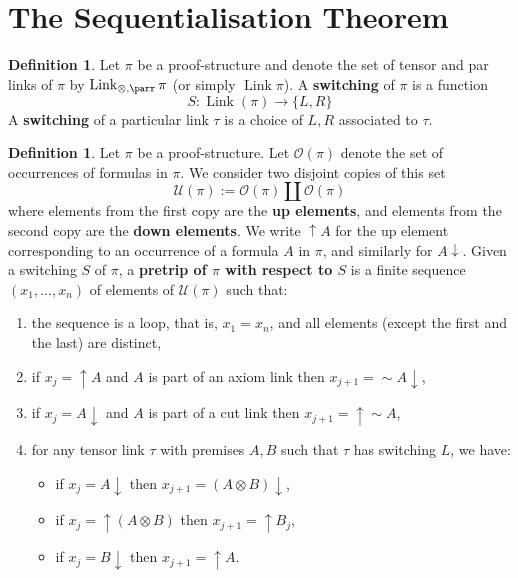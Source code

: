 \documentclass[12pt]{article}
\theoremstyle{plain}
\theoremstyle{definition}
\newtheorem{defn}[thm]{Definition} %
\newcommand{\call}[1]{\mathcal{#1}}
\newcommand{\lto}{\longrightarrow}
\newcommand{\negation}{\sim}
\begin{document}
\section{The Sequentialisation Theorem}\label{sec:sequentialisation}
\begin{defn}
Let $\pi$ be a proof-structure and denote the set of tensor and par links of $\pi$ by $\operatorname{Link}_{\otimes,\parr}\pi$ (or simply $\operatorname{Link}\pi$). A \textbf{switching} of $\pi$ is a function
\begin{equation}
    S: \operatorname{Link}(\pi) \lto \lbrace L,R\rbrace
\end{equation}
A \textbf{switching} of a particular link $\tau$ is a choice of $L,R$ associated to $\tau$.
\end{defn}
\begin{defn}\label{def:trip}
Let $\pi$ be a proof-structure. Let $\call{O}(\pi)$ denote the set of occurrences of formulas in $\pi$. We consider two disjoint copies of this set 
\begin{equation}
    \call{U}(\pi) := \call{O}(\pi) \coprod \call{O}(\pi)
\end{equation}
where elements from the first copy are the \textbf{up elements}, and elements from the second copy are the \textbf{down elements}. We write $\uparrow A$ for the up element corresponding to an occurrence of a formula $A$ in $\pi$, and similarly for $A\downarrow$. Given a switching $S$ of $\pi$, a \textbf{pretrip of $\pi$ with respect to $S$} is a finite sequence $(x_1,...,x_n)$ of elements of $\call{U}(\pi)$ such that:
\begin{enumerate}
    \item the sequence is a loop, that is, $x_1 = x_n$, and all elements (except the first and the last) are distinct,
    \item\label{def:trip_axiom} if $x_j=\uparrow A$ and $A$ is part of an axiom link then $x_{j+1} = \negation A\downarrow$,
    \item if $x_j = A\downarrow$ and $A$ is part of a cut link then $x_{j+1} = \uparrow \negation A$,
    \item for any tensor link $\tau$ with premises $A,B$ such that $\tau$ has switching $L$, we have:
    \begin{itemize}
        \item if $x_j = A \downarrow$ then $x_{j+1} = (A \otimes B)\downarrow$,
        \item if $x_j = \uparrow (A \otimes B)$ then $x_{j+1} = \uparrow B_j$,
        \item if $x_j = B \downarrow$ then $x_{j+1} = \uparrow A$.

\end{itemize}
\end{enumerate}
\end{defn}
\end{document}
